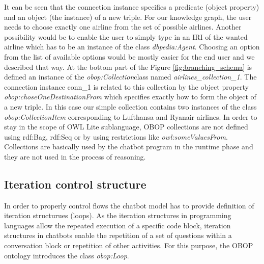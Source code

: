 \documentclass[runningheads]{llncs}
\begin{document}
It can be seen that the connection instance specifies a predicate (object property) and an object (the instance) of a new triple. For our knowledge graph, the user needs to choose exactly one airline from the set of possible airlines. Another possibility would be to enable the user to simply type in an IRI of the wanted airline which has to be an instance of the class \textit{dbpedia:Agent}. Choosing an option from the list of available options would be mostly easier for the end user and we described that way. At the bottom part of the Figure \ref{fig:branching_schema} is defined an instance of the \textit{obop:Collection}class named \textit{airlines\_collection\_1}. The connection instance conn\_1 is related to this collection by the object property \textit{obop:choseOneDestinationFrom} which specifies exactly how to form the object of a new triple. In this case our simple collection contains two instances of the class \textit{obop:CollectionItem} corresponding to Lufthansa and Ryanair airlines. 
In order to stay in the scope of OWL Lite sublanguage, OBOP collections are not defined using rdf:Bag, rdf:Seq or by using restrictions like \textit{owl:someValuesFrom}. Collections are basically used by the chatbot program in the runtime phase and they are not used in the process of reasoning.     


\FloatBarrier 
\subsection {Iteration control structure}
In order to properly control flows the chatbot model has to provide definition of iteration structurues (loops). As the iteration structures in programming languages allow the repeated execution of a specific code block, iteration structures in chatbots enable the repetition of a set of questions within a conversation block or repetition of other activities. For this purpose, the OBOP ontology introduces the class \textit{obop:Loop}. 
\end{document}
